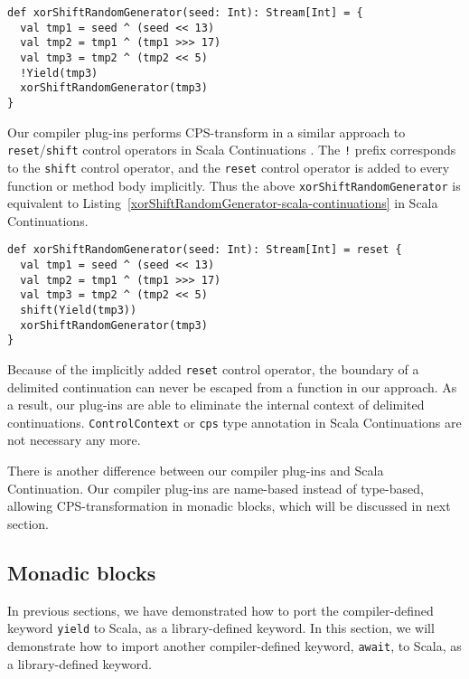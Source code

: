 \begin{lstlisting}[caption={TheXorshift pseudo-random number generator,  in the style of !-notation},label={xorShiftRandomGenerator-bang}]
def xorShiftRandomGenerator(seed: Int): Stream[Int] = {
  val tmp1 = seed ^ (seed << 13)
  val tmp2 = tmp1 ^ (tmp1 >>> 17)
  val tmp3 = tmp2 ^ (tmp2 << 5)
  !Yield(tmp3)
  xorShiftRandomGenerator(tmp3)
}
\end{lstlisting}

Our compiler plug-ins performs CPS-transform in a similar approach to \lstinline{reset}/\lstinline{shift} control operators in Scala Continuations \cite{rompf2009implementing}. The \lstinline{!} prefix corresponds to the \lstinline{shift} control operator, and the \lstinline{reset} control operator is added to every function or method body implicitly. Thus the above \lstinline{xorShiftRandomGenerator} is equivalent to Listing~\ref{xorShiftRandomGenerator-scala-continuations} in Scala Continuations.

\begin{lstlisting}[caption={TheXorshift pseudo-random number generator,  in Scala Continuations},label={xorShiftRandomGenerator-scala-continuations}]
def xorShiftRandomGenerator(seed: Int): Stream[Int] = reset {
  val tmp1 = seed ^ (seed << 13)
  val tmp2 = tmp1 ^ (tmp1 >>> 17)
  val tmp3 = tmp2 ^ (tmp2 << 5)
  shift(Yield(tmp3))
  xorShiftRandomGenerator(tmp3)
}
\end{lstlisting}

Because of the implicitly added \lstinline{reset} control operator, the boundary of a delimited continuation can never be escaped from a function in our approach. As a result, our plug-ins are able to eliminate the internal context of delimited continuations. \lstinline{ControlContext} or \lstinline{cps} type annotation in Scala Continuations are not necessary any more.

There is another difference between our compiler plug-ins and Scala Continuation. Our compiler plug-ins are name-based instead of type-based, allowing CPS-transformation in monadic blocks, which will be discussed in next section.

\subsection{Monadic blocks}\label{Monadic blocks}

In previous sections, we have demonstrated how to port the compiler-defined keyword \lstinline{yield} to Scala, as a library-defined keyword. In this section, we will demonstrate how to import another compiler-defined keyword, \lstinline{await}, to Scala, as a library-defined keyword.

